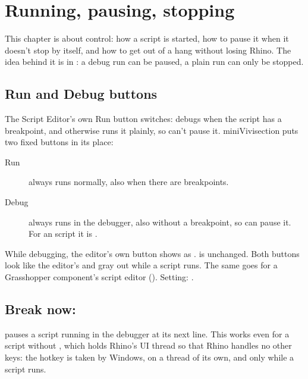\chapter{Running, pausing, stopping}\label{ch:running}

This chapter is about control: how a script is started, how to pause it when it doesn't stop by itself,
and how to get out of a hang without losing Rhino. The idea behind it is in : a
debug run can be paused, a plain run can only be stopped.

\section{Run and Debug buttons}\label{sec:runbuttons}

The Script Editor's own Run button switches:  debugs when the script has a breakpoint, and
otherwise runs it plainly, so  can't pause it. miniVivisection puts two fixed buttons in
its place:

\begin{description}
  \item[Run] always runs normally, also when there are breakpoints.
  \item[Debug] always runs in the debugger, also without a breakpoint, so  can pause it.
        For an  script it is .
\end{description}

While debugging, the editor's own button shows as .  is unchanged. Both buttons look
like the editor's and gray out while a script runs. The same goes for a Grasshopper component's script
editor (). Setting: .

\section{Break now: \texorpdfstring{}{Ctrl+Alt+B}}\label{sec:breaknow}

 pauses a script running in the debugger at its next line. This works even for a script
without , which holds Rhino's UI thread so that Rhino handles no other keys: the hotkey is
taken by Windows, on a thread of its own, and only while a script runs.

